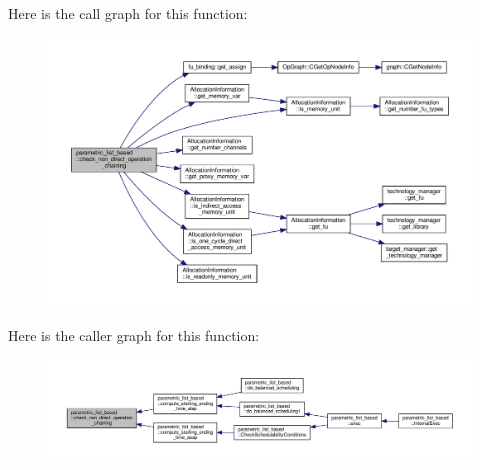 Here is the call graph for this function\+:
\nopagebreak
\begin{figure}[H]
\begin{center}
\leavevmode
\includegraphics[width=350pt]{d7/d47/classparametric__list__based_a6457256257347530f45f19ca4b85b6bc_cgraph}
\end{center}
\end{figure}
Here is the caller graph for this function\+:
\nopagebreak
\begin{figure}[H]
\begin{center}
\leavevmode
\includegraphics[width=350pt]{d7/d47/classparametric__list__based_a6457256257347530f45f19ca4b85b6bc_icgraph}
\end{center}
\end{figure}
\mbox{\label{classparametric__list__based_a4ffd85836c234c7ded92b33e992f20bb}} 
